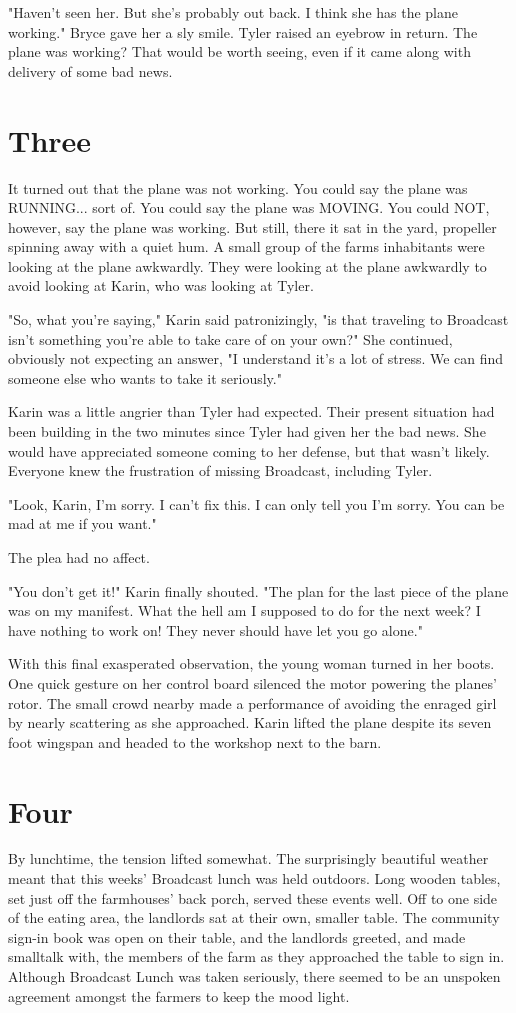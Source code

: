 \documentclass[12pt,novel,nonsubmission,smart]{sffms}
\begin{document}
"Haven't seen her. But she's probably out back. I think she has
the plane working." Bryce gave her a sly smile. Tyler raised an
eyebrow in return. The plane was working? That would be worth
seeing, even if it came along with delivery of some bad news.

\chapter{Three}
It turned out that the plane was not working. You could say the
plane was RUNNING... sort of. You could say the plane was
MOVING. You could NOT, however, say the plane was working. But
still, there it sat in the yard, propeller spinning away with a
quiet hum. A small group of the farms inhabitants were looking
at the plane awkwardly. They were looking at the plane awkwardly
to avoid looking at Karin, who was looking at Tyler.

"So, what you're saying," Karin said patronizingly, "is that traveling to Broadcast isn't
something you're able to take care of on your own?" She continued, obviously
not expecting an answer, "I understand it's a lot of stress. We can find
someone else who wants to take it seriously."

Karin was a little
angrier than Tyler had expected. Their present situation had
been building in the two minutes since Tyler had given her
the bad news. She would have appreciated someone coming 
to her defense, but that wasn't likely. Everyone knew the frustration
of missing Broadcast, including Tyler.

"Look, Karin, I'm sorry. I can't fix this. I can only tell you I'm sorry.
You can be mad at me if you want."

The plea had no affect.

"You don't get it!" Karin finally shouted. "The plan for the last piece of the plane was on my
manifest. What the hell am I supposed to do for the next week? I have
nothing to work on! They never should have let you go alone."

With this final exasperated observation, the young woman turned in
her boots. One quick gesture on her control board silenced the motor
powering the planes' rotor. The small crowd nearby made a performance
of avoiding the enraged girl by nearly scattering as she approached.
Karin lifted the plane despite its seven foot wingspan and headed to
the workshop next to the barn.


\chapter{Four}
By lunchtime, the tension lifted somewhat. The surprisingly beautiful
weather meant that this weeks' Broadcast lunch was held outdoors.
Long wooden tables, set just off the farmhouses' back porch, served
these events well. Off to one side of the eating area, the landlords 
sat at their own, smaller table. The community
sign-in book was open on their table, and the landlords greeted, and
made smalltalk with, the members of the farm as they approached the
table to sign in. Although Broadcast Lunch was taken seriously, there
seemed to be an unspoken agreement amongst the farmers to keep
the mood light.
\end{document}
